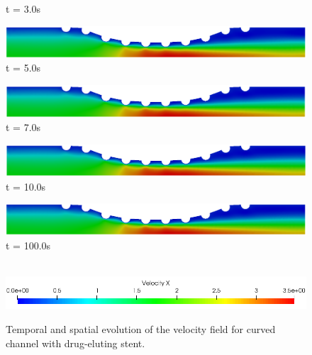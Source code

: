 \begin{figure}[H]
\begin{minipage}{.50\linewidth}
      t = 3.0s
     \end{minipage}
     \begin{minipage}{.50\linewidth}
      \centering
      \includegraphics[scale=0.18]{./02_chaps/cap_solution/figure/vel_CurvedStrut5.png}\\
      t = 5.0s
     \end{minipage}%
     \begin{minipage}{.50\linewidth}
      \centering
      \includegraphics[scale=0.18]{./02_chaps/cap_solution/figure/vel_CurvedStrut6.png}\\
      t = 7.0s
     \end{minipage}
     \begin{minipage}{.50\linewidth}
     \medskip
      \centering
      \includegraphics[scale=0.18]{./02_chaps/cap_solution/figure/vel_CurvedStrut7.png}\\
      t = 10.0s
     \end{minipage}%
     \begin{minipage}{.50\linewidth}
     \medskip
      \centering
      \includegraphics[scale=0.18]{./02_chaps/cap_solution/figure/vel_CurvedStrut8.png}\\
      t = 100.0s
     \end{minipage}\\[10pt]
      \centering
      \includegraphics[scale=0.5]{./02_chaps/cap_solution/figure/vel_CurvedStrutScale.png}\\
     \medskip
     \caption{
Temporal and spatial evolution of the velocity field for curved channel with
drug-eluting stent.}
     \label{velocity field curved stent}
\end{figure}



